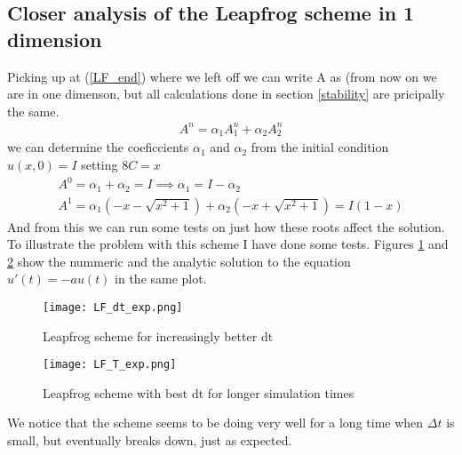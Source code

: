 \documentclass[a4paper,english, 10pt, twoside]{article}
\begin{document}
\subsection{Closer analysis of the Leapfrog scheme in 1 dimension}
Picking up at (\ref{LF_end}) where we left off we can write A as (from now on we are in one dimenson, but all calculations done in section 
\ref{stability} are pricipally the same.
\begin{align*}
 A^n = \alpha_1A_1^n + \alpha_2A_2^n
\end{align*}
we can determine the coeficcients $\alpha_1$ and $\alpha_2$ from the initial condition $u(x,0) = I$ setting $8C = x$
\begin{align*}
 A^0 = \alpha_1 + \alpha_2 = I \implies \alpha_1 = I-\alpha_2 \\
 A^1 = \alpha_1(-x- \sqrt{x^2 + 1}) +\alpha_2 (-x + \sqrt{x^2 + 1}) = I(1 - x)
\end{align*}
And from this we can run some tests on just how these roots affect the solution.\\
To illustrate the problem with this scheme I have done some tests. Figures \ref{LF_error1} and \ref{LF_error2} show the nummeric 
and the analytic solution to the equation $u'(t) = -au(t)$ in the same plot.
\begin{figure}[H]
 \centering
 \texttt{[image: LF\_dt\_exp.png]}
 \caption{Leapfrog scheme for increasingly better dt}
 \label{LF_error1}
\end{figure}
\begin{figure}[H]
 \centering
 \texttt{[image: LF\_T\_exp.png]}
 \caption{Leapfrog scheme with best dt for longer simulation times}
 \label{LF_error2}
\end{figure}
We notice that the scheme seems to be doing very well for a long time when $\Delta t$ is small, but eventually breaks down, just as expected.
\end{document}
